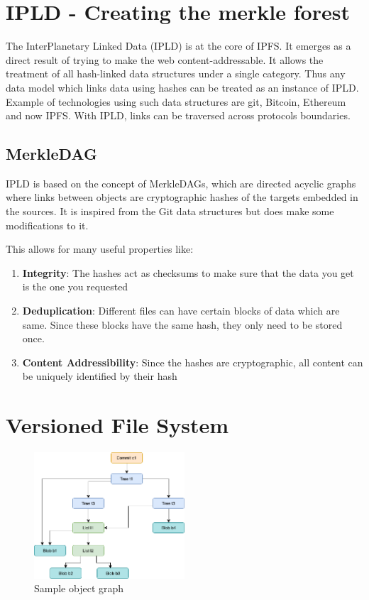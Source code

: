 \section{IPLD - Creating the merkle forest}

The InterPlanetary Linked Data (IPLD) is at the core of IPFS. It emerges as a direct result of trying to make the web content-addressable. It allows the treatment of all hash-linked data structures under a single category. Thus any data model which links data using hashes can be treated as an instance of IPLD. Example of technologies using such data structures are git, Bitcoin, Ethereum and now IPFS. With IPLD, links can be traversed across protocols boundaries.

\subsection{MerkleDAG}

IPLD is based on the concept of MerkleDAGs, which are directed acyclic graphs where links between objects are cryptographic hashes of the targets embedded in the sources. It is inspired from the Git data structures but does make some modifications to it.

This allows for many useful properties like:
\begin{enumerate}
    \item \textbf{Integrity}: The hashes act as checksums to make sure that the data you get is the one you requested
    \item \textbf{Deduplication}: Different files can have certain blocks of data which are same. Since these blocks have the same hash, they only need to be stored once.
    \item \textbf{Content Addressibility}: Since the hashes are cryptographic, all content can be uniquely identified by their hash
\end{enumerate}

\section{Versioned File System}

\begin{figure}[h]
\caption{Sample object graph}
\centering
\includegraphics[width=0.5\textwidth]{ipfs}
\end{figure}


